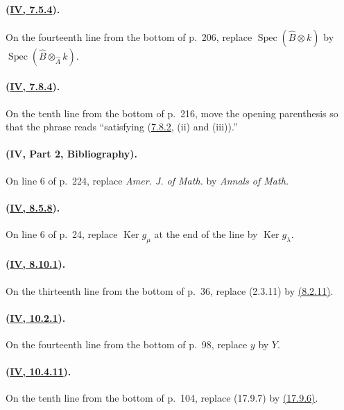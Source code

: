 \paragraph{({\texorpdfstring{\protect\hyperref[IV.7.5.4]{IV, 7.5.4}}{IV, 7.5.4}}).}
On the fourteenth line from the bottom of p.~206, replace
$\operatorname{Spec}(\widehat B\otimes k)$ by
$\operatorname{Spec}(\widehat B\otimes_{\widehat A}k)$.

\paragraph{({\texorpdfstring{\protect\hyperref[IV.7.8.4]{IV, 7.8.4}}{IV, 7.8.4}}).}
On the tenth line from the bottom of p.~216, move the opening parenthesis
so that the phrase reads ``satisfying ({\hyperref[IV.7.8.2]{7.8.2}}, (ii) and (iii)).''

\paragraph{(IV, Part 2, Bibliography).}
On line 6 of p.~224, replace \emph{Amer. J. of Math.} by
\emph{Annals of Math.}

\paragraph{({\texorpdfstring{\protect\hyperref[IV.8.5.8]{IV, 8.5.8}}{IV, 8.5.8}}).}
On line 6 of p.~24, replace $\operatorname{Ker}g_\mu$ at the end of the
line by $\operatorname{Ker}g_\lambda$.

\paragraph{({\texorpdfstring{\protect\hyperref[IV.8.10.1]{IV, 8.10.1}}{IV, 8.10.1}}).}
On the thirteenth line from the bottom of p.~36, replace (2.3.11) by
{\hyperref[IV.8.2.11]{(8.2.11)}}.

\paragraph{({\texorpdfstring{\protect\hyperref[IV.10.2.1]{IV, 10.2.1}}{IV, 10.2.1}}).}
On the fourteenth line from the bottom of p.~98, replace $y$ by $Y$.

\paragraph{({\texorpdfstring{\protect\hyperref[IV.10.4.11]{IV, 10.4.11}}{IV, 10.4.11}}).}
On the tenth line from the bottom of p.~104, replace (17.9.7) by
{\hyperref[IV.17.9]{(17.9.6)}}.

